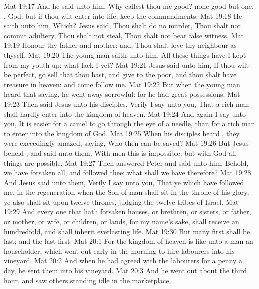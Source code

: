 \vs Mat 19:17 And he said unto him, Why callest thou me good?  none good but one, , God: but if thou wilt enter into life, keep the commandments.
\vs Mat 19:18 He saith unto him, Which? Jesus said, Thou shalt do no murder, Thou shalt not commit adultery, Thou shalt not steal, Thou shalt not bear false witness,
\vs Mat 19:19 Honour thy father and  mother: and, Thou shalt love thy neighbour as thyself.
\vs Mat 19:20 The young man saith unto him, All these things have I kept from my youth up: what lack I yet?
\vs Mat 19:21 Jesus said unto him, If thou wilt be perfect, go  sell that thou hast, and give to the poor, and thou shalt have treasure in heaven: and come  follow me.
\vs Mat 19:22 But when the young man heard that saying, he went away sorrowful: for he had great possessions.
\vs Mat 19:23 Then said Jesus unto his disciples, Verily I say unto you, That a rich man shall hardly enter into the kingdom of heaven.
\vs Mat 19:24 And again I say unto you, It is easier for a camel to go through the eye of a needle, than for a rich man to enter into the kingdom of God.
\vs Mat 19:25 When his disciples heard , they were exceedingly amazed, saying, Who then can be saved?
\vs Mat 19:26 But Jesus beheld , and said unto them, With men this is impossible; but with God all things are possible.
\vs Mat 19:27 Then answered Peter and said unto him, Behold, we have forsaken all, and followed thee; what shall we have therefore?
\vs Mat 19:28 And Jesus said unto them, Verily I say unto you, That ye which have followed me, in the regeneration when the Son of man shall sit in the throne of his glory, ye also shall sit upon twelve thrones, judging the twelve tribes of Israel.
\vs Mat 19:29 And every one that hath forsaken houses, or brethren, or sisters, or father, or mother, or wife, or children, or lands, for my name's sake, shall receive an hundredfold, and shall inherit everlasting life.
\vs Mat 19:30 But many  first shall be last; and the last  first.
\vs Mat 20:1 For the kingdom of heaven is like unto a man  an householder, which went out early in the morning to hire labourers into his vineyard.
\vs Mat 20:2 And when he had agreed with the labourers for a penny a day, he sent them into his vineyard.
\vs Mat 20:3 And he went out about the third hour, and saw others standing idle in the marketplace,
